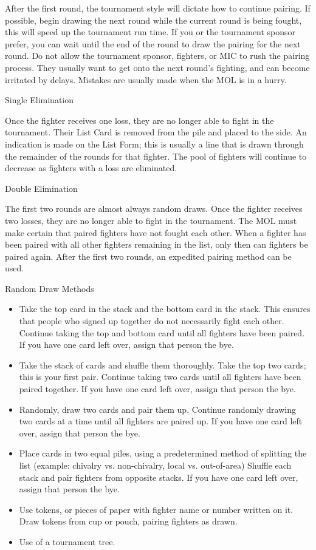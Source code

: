 \documentclass{article}
\begin{document}
After the first round, the tournament style will dictate how to continue pairing. If possible, begin drawing
the next round while the current round is being fought, this will speed up the tournament run time. If you
or the tournament sponsor prefer, you can wait until the end of the round to draw the pairing for the next
round. Do not allow the tournament sponsor, fighters, or MIC to rush the pairing process. They usually
want to get onto the next round’s fighting, and can become irritated by delays. Mistakes are usually made
when the MOL is in a hurry.


Single Elimination

Once the fighter receives one loss, they are no longer able to fight in the tournament. Their List Card is
removed from the pile and placed to the side. An indication is made on the List Form; this is usually a line
that is drawn through the remainder of the rounds for that fighter. The pool of fighters will continue to
decrease as fighters with a loss are eliminated.

Double Elimination

The first two rounds are almost always random draws. Once the fighter receives two losses, they are no
longer able to fight in the tournament. The MOL must make certain that paired fighters have not fought
each other. When a fighter has been paired with all other fighters remaining in the list, only then can
fighters be paired again. After the first two rounds, an expedited pairing method can be used.

Random Draw Methods
\begin{itemize}
\item Take the top card in the stack and the bottom card in the stack. This ensures that people who signed up
together do not necessarily fight each other. Continue taking the top and bottom card until all fighters
have been paired. If you have one card left over, assign that person the bye.

\item Take the stack of cards and shuffle them thoroughly. Take the top two cards; this is your first pair.
Continue taking two cards until all fighters have been paired together. If you have one card left over,
assign that person the bye.

\item Randomly, draw two cards and pair them up. Continue randomly drawing two cards at a time until all
fighters are paired up. If you have one card left over, assign that person the bye.

\item Place cards in two equal piles, using a predetermined method of splitting the list (example: chivalry vs.
non-chivalry, local vs. out-of-area) Shuffle each stack and pair fighters from opposite stacks. If you
have one card left over, assign that person the bye.

\item Use tokens, or pieces of paper with fighter name or number written on it. Draw tokens from cup or
pouch, pairing fighters as drawn.

\item Use of a tournament tree.
\end{itemize}
\end{document}
